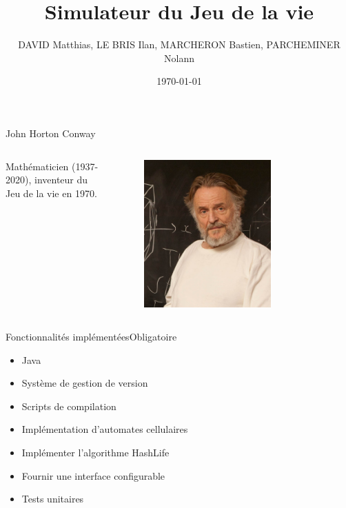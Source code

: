 \documentclass{beamer}
\title{Simulateur du Jeu de la vie}
\author{DAVID Matthias, LE BRIS Ilan, MARCHERON Bastien, PARCHEMINER Nolann}
\institute{Université de Caen Normandie}
\date{\today}
\begin{document}
	\frame{\titlepage}
	
	\begin{frame}{John Horton Conway}
		\begin{columns}
			\begin{column}{0.5\textwidth}
				Mathématicien (1937-2020), inventeur du Jeu de la vie en 1970.
			\end{column}
			\begin{column}{0.5\textwidth}
				\begin{figure}
					\centering
					\includegraphics[width=0.7\textwidth]{image/Conway.jpg}
				\end{figure}
			\end{column}
		\end{columns}
	\end{frame}

	\begin{frame}{Fonctionnalités implémentées}{Obligatoire}
		\begin{itemize}
			\item Java
			\item Système de gestion de version
			\item Scripts de compilation
			\item Implémentation d'automates cellulaires
			\item Implémenter l'algorithme HashLife
			\item Fournir une interface configurable
			\item Tests unitaires
		\end{itemize}
	\end{frame}
\end{document}
